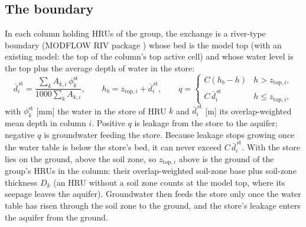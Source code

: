 \subsection{The boundary}
In each column holding HRUs of the group, the exchange is a river-type boundary (MODFLOW RIV package ) whose bed is the
model top (with an existing model: the top of the column's top active cell) and whose water level is the top plus the average depth of water in the store:
\begin{equation}
\bar d^{\,\mathrm{st}}_i=\frac{\sum_kA_{k,i}\,\phi^{\mathrm{st}}_k}{1000\sum_kA_{k,i}},\qquad h_b=z_{\mathrm{top},i}+\bar d^{\,\mathrm{st}}_i,
\qquad q=\begin{cases}C\left(h_b-h\right) & h>z_{\mathrm{top},i},\\ C\,\bar d^{\,\mathrm{st}}_i & h\le z_{\mathrm{top},i},\end{cases}
\end{equation}
with $\phi^{\mathrm{st}}_k$ [mm] the water in the store of HRU $k$ and $\bar d^{\,\mathrm{st}}_i$ [m] its overlap-weighted mean depth in column $i$. Positive $q$ is leakage from the store to
the aquifer; negative $q$ is groundwater feeding the store. Because leakage stops growing once the water table is below
the store's bed, it can never exceed $C\,\bar d^{\,\mathrm{st}}_i$.
With  the store lies on the ground, above the soil zone, so $z_{\mathrm{top},i}$ above is the ground of the
group's HRUs in the column: their overlap-weighted soil-zone base plus soil-zone thickness $D_k$ (an HRU without a soil zone
counts at the model top, where its seepage leaves the aquifer). Groundwater then feeds the store only once the water table
has risen through the soil zone to the ground, and the store's leakage enters the aquifer from the ground.

